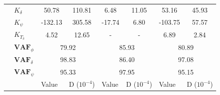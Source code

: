 \begin{table}[]
\begin{tabular}{llcccccc}
                                 & $K_\delta $           & 50.78                                      & 110.81                                             & 6.48                                       & 11.05                                              & 53.16                                      & 45.93                                              \\
                                 & $K_\psi $             & -132.13                                    & 305.58                                             & -17.74                                     & 6.80                                               & -103.75                                    & 57.57                                              \\
                                 & $K_{T_\delta}$        & 4.52                                       & 12.65                                              & -                                          & -                                                  & 6.89                                       & 2.84                                               \\ \cline{2-8} 
                                 & $\mathbf{VAF}_\phi$   & \multicolumn{2}{c}{79.92}                                                                       & \multicolumn{2}{c}{85.93}                                                                       & \multicolumn{2}{c}{80.89}                                                                       \\
                                 & $\mathbf{VAF}_\delta$ & \multicolumn{2}{c}{98.83}                                                                       & \multicolumn{2}{c}{86.40}                                                                       & \multicolumn{2}{c}{97.08}                                                                       \\
                                 & $\mathbf{VAF}_\psi$   & \multicolumn{2}{c}{95.33}                                                                       & \multicolumn{2}{c}{97.95}                                                                       & \multicolumn{2}{c}{95.15}                                                                       \\ \hline
                                 &                       & \multicolumn{1}{l}{\multirow{2}{*}{Value}} & \multicolumn{1}{l}{\multirow{2}{*}{D ($10^{-4}$)}} & \multicolumn{1}{l}{\multirow{2}{*}{Value}} & \multicolumn{1}{l}{\multirow{2}{*}{D ($10^{-4}$)}} & \multicolumn{1}{l}{\multirow{2}{*}{Value}} & \multicolumn{1}{l}{\multirow{2}{*}{D ($10^{-4}$)}} \\

\end{tabular}
\end{table}
